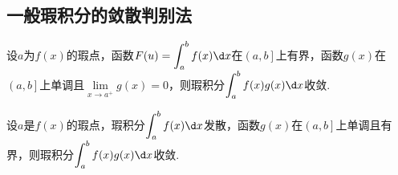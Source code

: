 \subsection{一般瑕积分的敛散判别法}
\begin{theorem}[Dirichlet判别法]
	设$a$为$f(x)$的瑕点，函数$F(u)=\displaystyle\int_{a}^{b}f(x)\d x$在$\left(a,b\right]$上有界，函数$g(x)$在$\left(a,b\right]$上单调且$\lim\limits_{x\to a^+}g(x)=0$，则瑕积分$\displaystyle\int_{a}^{b}f(x)g(x)\d x$收敛.
\end{theorem}
\begin{theorem}[Abel判别法]
	设$a$是$f(x)$的瑕点，瑕积分$\displaystyle\int_{a}^{b}f(x)\d x$发散，函数$g(x)$在$\left(a,b\right]$上单调且有界，则瑕积分$\displaystyle\int_{a}^{b}f(x)g(x)\d x$收敛.
\end{theorem}